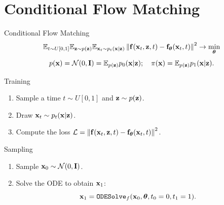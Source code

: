 \documentclass{beamer}
\begin{document}
\section{Conditional Flow Matching}
\begin{frame}{Conditional Flow Matching}
	\[
		\mathbb{E}_{t \sim U[0, 1]} \mathbb{E}_{\mathbf{z} \sim p(\mathbf{z})} \mathbb{E}_{\mathbf{x}_t \sim p_t(\mathbf{x} | \mathbf{z})}\left\| \mathbf{f}(\mathbf{x}_t, \mathbf{z}, t) - \mathbf{f}_{\boldsymbol{\theta}}(\mathbf{x}_t, t) \right\|^2 \rightarrow \min_{\boldsymbol{\theta}}
	\]
	\eqpause
	\[
		p(\mathbf{x}) = \mathcal{N}(0, \mathbf{I}) = \mathbb{E}_{p(\mathbf{z})} p_0(\mathbf{x} | \mathbf{z}); \quad \pi(\mathbf{x}) = \mathbb{E}_{p(\mathbf{z})} p_1(\mathbf{x} | \mathbf{z}).
	\]
	\eqpause
	\vspace{-0.3cm}
	\begin{block}{Training}
		\begin{enumerate}
			\item Sample a time $t \sim U[0, 1]$ and $\mathbf{z} \sim p(\mathbf{z})$.
			\item Draw $\mathbf{x}_t \sim p_t(\mathbf{x} | \mathbf{z})$.
			\item Compute the loss $ \mathcal{L} = \left\| \mathbf{f}(\mathbf{x}_t, \mathbf{z}, t) - \mathbf{f}_{\boldsymbol{\theta}}(\mathbf{x}_t, t) \right\|^2 $.
		\end{enumerate}
	\end{block}
	\eqpause
	\begin{block}{Sampling}
		\begin{enumerate}
			\item Sample $\mathbf{x}_0 \sim \mathcal{N}(0, \mathbf{I})$.
			\item Solve the ODE to obtain $\mathbf{x}_1$:
			\[
				\mathbf{x}_1 = \texttt{ODESolve}_f(\mathbf{x}_0, \boldsymbol{\theta}, t_0=0, t_1=1).
			\]
		\end{enumerate}
	\end{block}
\end{frame}
\end{document}
